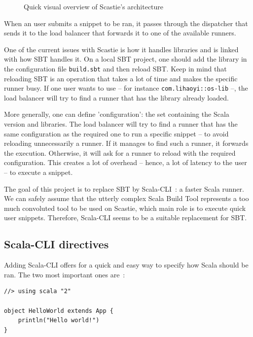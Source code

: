\documentclass{article}
\begin{document}
\begin{figure}[h!]
    \centering
    
    \label{fig:scastie_architecture}
    \caption{Quick visual overview of Scastie's architecture}
\end{figure}

When an user submits a snippet to be ran, it passes through the dispatcher that sends it to the load balancer that forwards it to one of the
available runners.

One of the current issues with Scastie is how it handles libraries and is linked with how SBT handles it.
On a local SBT project, one should add the library in the configuration file \lstinline{build.sbt} and then reload SBT.
Keep in mind that reloading SBT is an operation that takes a lot of time and makes the specific runner busy.
If one user wants to use -- for instance \lstinline{com.lihaoyi::os-lib} --, the load balancer will try to find a runner that has
the library already loaded.

More generally, one can define 'configuration': the set containing the Scala version and libraries. The load balancer will try to find a
runner that has the same configuration as the required one to run a specific snippet -- to avoid reloading unnecessarily a runner.
If it manages to find such a runner, it forwards the execution. Otherwise, it will ask for a runner to reload with the
required configuration. This creates a lot of overhead -- hence, a lot of latency to the user -- to execute a snippet.

The goal of this project is to replace SBT by Scala-CLI~: a faster Scala runner. We can safely assume that the utterly complex Scala Build
Tool represents a too much convoluted tool to be used on Scastie, which main role is to execute quick user snippets.
Therefore, Scala-CLI seems to be a suitable replacement for SBT.

\subsection{Scala-CLI directives}

Adding Scala-CLI offers for a quick and easy way to specify how Scala should be ran. The two most important ones are~:

\begin{lstlisting}[style=sc]
//> using scala "2"

object HelloWorld extends App {
    println("Hello world!")
}
\end{lstlisting}
\end{document}
